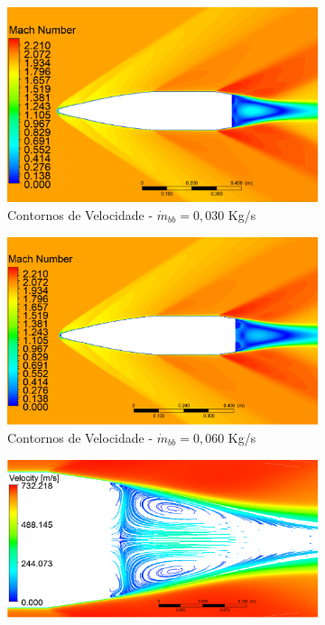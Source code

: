 \begin{figure}[!ht]
\begin{subfigure}[b]{0.47\textwidth}
        \includegraphics[width=\textwidth]{contorno-velocidade-2306K-vazao-0030-2pol.png}
        \caption{Contornos de Velocidade - $\Dot{m}_{bb} = 0,030$ Kg/s}
        \label{fig:contorno-velocidade-bb-2pol-vazao-0030}
    \end{subfigure}
    \hfill
	\begin{subfigure}[b]{0.47\textwidth}
        \centering
        \includegraphics[width=\textwidth]{contorno-velocidade-2306K-vazao-0060-2pol.png}
        \caption{Contornos de Velocidade - $\Dot{m}_{bb} = 0,060$ Kg/s}
        \label{fig:contorno-velocidade-bb-2pol-vazao-0060}
    \end{subfigure}
	\hfill
	\begin{subfigure}[b]{0.47\textwidth}
        \centering
        \includegraphics[width=\textwidth]{corrente-velocidade-2306K-vazao-0030-2pol.png}

\end{subfigure}
\end{figure}
